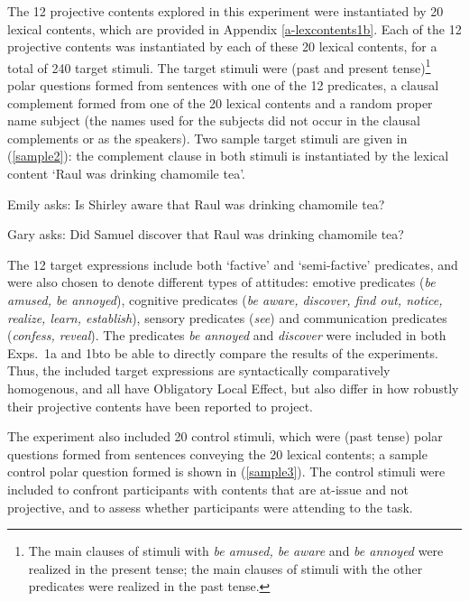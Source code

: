 \documentclass[11pt,fleqn]{article}
\newcommand{\6}{\mbox{$[\hspace*{-.6mm}[$}}
\newcommand{\9}{\mbox{$]\hspace*{-.6mm}]$}}
\begin{document}
The 12 projective contents explored in this experiment were instantiated by 20 lexical contents, which are provided in Appendix \ref{a-lexcontents1b}.  Each of the 12 projective contents was instantiated by each of these 20 lexical contents, for a total of 240 target stimuli. The target stimuli were (past and present tense)\footnote{The main clauses of stimuli with {\em be amused, be aware} and {\em be annoyed} were realized in the present tense; the main clauses of stimuli with the other predicates were realized in the past tense.} polar questions formed from sentences with one of the 12 predicates, a clausal complement formed from one of the 20 lexical contents and a random proper name subject (the names used for the subjects did not occur in the clausal complements or as the speakers). Two sample target stimuli are given in (\ref{sample2}): the complement clause in both stimuli is instantiated by the lexical content `Raul was drinking chamomile tea'.

\begin{exe}
\ex\label{sample2}
\begin{xlist}
\ex Emily asks: Is Shirley aware that Raul was drinking chamomile tea?

\ex Gary asks: Did Samuel discover that Raul was drinking chamomile tea?
\end{xlist}
\end{exe}

The 12 target expressions include both `factive' and `semi-factive' predicates, and were also chosen to denote different types of attitudes: emotive predicates ({\em be amused, be annoyed}), cognitive predicates ({\em be aware, discover, find out, notice, realize, learn, establish}), sensory predicates ({\em see}) and communication predicates ({\em confess, reveal}). The predicates {\em be annoyed} and {\em discover} were included in both Exps.~1a and 1bto be able to directly compare the results of the experiments. Thus, the included target expressions are syntactically comparatively homogenous, and all have Obligatory Local Effect, but also differ in how robustly their projective contents have been reported to project.



The experiment also included 20 control stimuli, which were (past tense) polar questions formed from sentences conveying the 20 lexical contents; a sample control polar question formed is shown in (\ref{sample3}). The control stimuli were included to confront participants with contents that are at-issue and not projective, and to assess whether participants were attending to the task.
\end{document}

